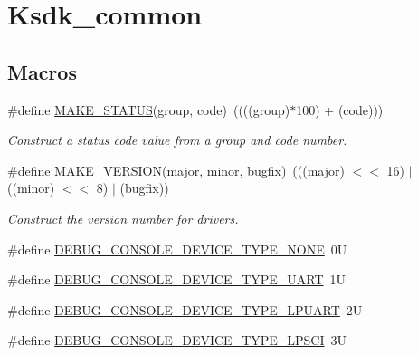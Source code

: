 \hypertarget{group__ksdk__common}{}\section{Ksdk\+\_\+common}
\label{group__ksdk__common}
\subsection*{Macros}
\begin{DoxyCompactItemize}
\item 
\mbox{\label{group__ksdk__common_gad76dfbb0423d0cd3a7b77cbcd9043146}} 
\#define \mbox{\hyperlink{group__ksdk__common_gad76dfbb0423d0cd3a7b77cbcd9043146}{M\+A\+K\+E\+\_\+\+S\+T\+A\+T\+US}}(group,  code)~((((group)$\ast$100) + (code)))
\begin{DoxyCompactList}\small\item\em Construct a status code value from a group and code number. \end{DoxyCompactList}\item 
\mbox{\label{group__ksdk__common_ga812138aa3315b0c6953c1a26130bcc37}} 
\#define \mbox{\hyperlink{group__ksdk__common_ga812138aa3315b0c6953c1a26130bcc37}{M\+A\+K\+E\+\_\+\+V\+E\+R\+S\+I\+ON}}(major,  minor,  bugfix)~(((major) $<$$<$ 16) $\vert$ ((minor) $<$$<$ 8) $\vert$ (bugfix))
\begin{DoxyCompactList}\small\item\em Construct the version number for drivers. \end{DoxyCompactList}\item 
\#define \mbox{\hyperlink{group__ksdk__common_gaa7fc9e15d36453236a580b3c8116ee85}{D\+E\+B\+U\+G\+\_\+\+C\+O\+N\+S\+O\+L\+E\+\_\+\+D\+E\+V\+I\+C\+E\+\_\+\+T\+Y\+P\+E\+\_\+\+N\+O\+NE}}~0U
\item 
\#define \mbox{\hyperlink{group__ksdk__common_ga59764d32e5394455906edbf03cff0b9f}{D\+E\+B\+U\+G\+\_\+\+C\+O\+N\+S\+O\+L\+E\+\_\+\+D\+E\+V\+I\+C\+E\+\_\+\+T\+Y\+P\+E\+\_\+\+U\+A\+RT}}~1U
\item 
\#define \mbox{\hyperlink{group__ksdk__common_ga1a04b7330b5196f73ed4ffe7fa2bae6c}{D\+E\+B\+U\+G\+\_\+\+C\+O\+N\+S\+O\+L\+E\+\_\+\+D\+E\+V\+I\+C\+E\+\_\+\+T\+Y\+P\+E\+\_\+\+L\+P\+U\+A\+RT}}~2U
\item 
\#define \mbox{\hyperlink{group__ksdk__common_ga6b4add5f2d938a89da56f58ac0b4e89b}{D\+E\+B\+U\+G\+\_\+\+C\+O\+N\+S\+O\+L\+E\+\_\+\+D\+E\+V\+I\+C\+E\+\_\+\+T\+Y\+P\+E\+\_\+\+L\+P\+S\+CI}}~3U

\end{DoxyCompactItemize}

